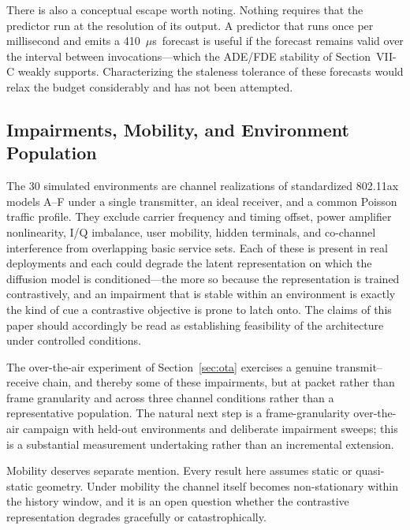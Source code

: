 \documentclass[lettersize,journal]{IEEEtran}
\newcommand{\us}{\ensuremath{\mu}s}
\begin{document}
There is also a conceptual escape worth noting. Nothing requires that
the predictor run at the resolution of its output. A predictor that runs
once per millisecond and emits a 410~\us\ forecast is useful if the
forecast remains valid over the interval between invocations---which the
ADE/FDE stability of Section~VII-C weakly supports. Characterizing the
staleness tolerance of these forecasts would relax the budget
considerably and has not been attempted.

\subsection{\textbf{Impairments, Mobility, and Environment Population}}
The 30 simulated environments are channel realizations of standardized
802.11ax models A--F under a single transmitter, an ideal receiver, and
a common Poisson traffic profile. They exclude carrier frequency and
timing offset, power amplifier nonlinearity, I/Q imbalance, user
mobility, hidden terminals, and co-channel interference from overlapping
basic service sets. Each of these is present in real deployments and each
could degrade the latent representation on which the diffusion model is
conditioned---the more so because the representation is trained
contrastively, and an impairment that is stable within an environment is
exactly the kind of cue a contrastive objective is prone to latch onto.
The claims of this paper should accordingly be read as establishing
feasibility of the architecture under controlled conditions.

The over-the-air experiment of Section~\ref{sec:ota} exercises a genuine
transmit--receive chain, and thereby some of these impairments, but at
packet rather than frame granularity and across three channel conditions
rather than a representative population. The natural next step is a
frame-granularity over-the-air campaign with held-out environments and
deliberate impairment sweeps; this is a substantial measurement
undertaking rather than an incremental extension.

Mobility deserves separate mention. Every result here assumes static or
quasi-static geometry. Under mobility the channel itself becomes
non-stationary within the history window, and it is an open question
whether the contrastive representation degrades gracefully or
catastrophically.

\end{document}
